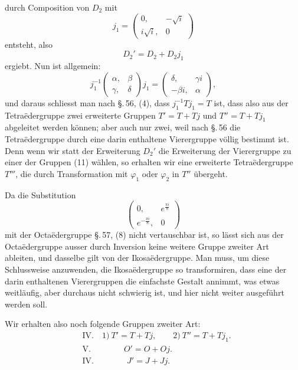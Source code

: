 durch Composition von $D_2$ mit
\[
j_1 = \begin{pmatrix} 0, & -\sqrt{i} \\ i\sqrt{i}, & 0 \end{pmatrix}
\]
entsteht, also
\[
D_2' = D_2 + D_2 j_1
\]
ergiebt. Nun ist allgemein:
\[
j_1^{-1} \begin{pmatrix} \alpha, & \beta \\ \gamma, & \delta \end{pmatrix} j_1 = \begin{pmatrix} \delta, & \gamma i \\ -\beta i, & \alpha \end{pmatrix},
\]
und daraus schliesst man nach \S.\,56, (4), dass $j_1^{-1} T j_1 = T$ ist, dass also aus der Tetra\"edergruppe zwei erweiterte Gruppen $T' = T+Tj$ und $T'' = T+Tj_1$ abgeleitet werden können; aber auch nur zwei, weil nach \S.\,56 die Tetra\"edergruppe durch eine darin enthaltene Vierergruppe völlig bestimmt ist. Denn wenn wir statt der Erweiterung $D_2'$ die Erweiterung der Vierergruppe zu einer der Gruppen (11) wählen, so erhalten wir eine erweiterte Tetra\"edergruppe $T'''$, die durch Transformation mit $\varphi_1$ oder $\varphi_2$ in $T''$ übergeht.

Da die Substitution
\[
\begin{pmatrix} 0, & e^{\frac{\pi i}{8}} \\ e^{-\frac{\pi i}{8}}, & 0 \end{pmatrix}
\]
mit der Octa\"edergruppe \S.\,57, (8) nicht vertauschbar ist, so lässt sich aus der Octa\"edergruppe ausser durch Inversion keine weitere Gruppe zweiter Art ableiten, und dasselbe gilt von der Ikosa\"edergruppe. Man muss, um diese Schlussweise anzuwenden, die Ikosa\"edergruppe so transformiren, dass eine der darin enthaltenen Vierergruppen die einfachste Gestalt annimmt, was etwas weitläufig, aber durchaus nicht schwierig ist, und hier nicht weiter ausgeführt werden soll.

Wir erhalten also noch folgende Gruppen zweiter Art:
\[
\begin{aligned}
&\text{IV.}\quad 1)\ T' = T+Tj, \qquad 2)\ T'' = T+Tj_1.\\
&\text{V.}\qquad\qquad O' = O+Oj.\\
&\text{IV.}\qquad\qquad J' = J+Jj.
\end{aligned}
\]
